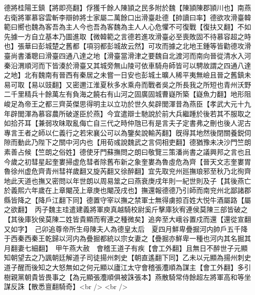 德將桂陽王鎮【將即亮翻】俘獲千餘人陳頴之民多附於魏【陳頴陳郡頴川也】南燕右衛將軍慕容雲斬李辯帥將士家屬二萬餘口出滑臺赴德【帥讀曰率】德欲攻滑臺韓範曰嚮也魏為客吾為主人今也吾為客魏為主人人心危懼不可復戰【復扶又翻】不如先據一方自立基本乃圖進取【微韓範之言德若進攻滑臺必至喪敗固不待慕容超之時也】張華曰彭城楚之舊都【項羽都彭城故云然】可攻而據之北地王鍾等皆勸德攻滑臺尚書潘聰曰滑臺四通八達之地【滑臺當滑津之要魏自北渡河而南向晉從清水入河秦沿渭順河而下皆湊於滑臺又其城旁無山陵可依車騎舟師皆可以騁故謂之四通八達之地】北有魏南有晉西有秦居之未嘗一日安也彭城土曠人稀平夷無嶮且晉之舊鎮未易可取【易以豉翻】又密邇江淮夏秋多水乘舟而戰者吳之所長我之所短也青州沃野二千里精兵十餘萬左有負海之饒右有山河之固廣固城曹嶷所築【嶷魚力翻】地形阻峻足為帝王之都三齊英傑思得明主以立功於世久矣辟閭渾昔為燕臣【孝武大元十九年辟閭渾為慕容農所破遂臣於燕】今宜遣辯士馳說於前大兵繼踵於後若其不服取之如拾芥耳【兼弱攻昧取亂侮亡自三代之時仲虺已有是言夫子定書弗之刪也後人泥古專言王者之師以仁義行之若宋襄公可以為鑒矣說輸芮翻】旣得其地然後閉關養鋭伺隙而動此乃陛下之關中河内也【用荀彧說魏武之言伺相吏翻】德猶豫未决沙門竺朗素善占候【竺朗之俗姓】德使牙門蘇撫問之朗曰敬覽三策潘尚書之議興邦之言也且今歲之初彗星起奎婁掃虚危彗者除舊布新之象奎婁為魯虛危為齊【晉天文志奎婁胃魯徐州虚危齊青州彗祥歲翻又旋芮翻又徐醉翻】宜先取兖州廵撫琅邪至秋乃北徇齊地此天道也撫又密問以年世朗以周易筮之曰燕衰庚戌年則一紀世則及子【其後燕亡於義熙六年歲在上章閹茂上章庚也閹茂戌也】撫還報德德乃引師而南兖州北鄙諸郡縣皆降之【降戶江翻下同】德置守宰以撫之禁軍士無得虜掠百姓大悦牛酒屬路【屬之欲翻】　丙子魏主珪遣建義將軍庾真越騎校尉奚斤擊庫狄宥連侯莫陳三部皆破之【其後庫狄侯莫陳二姓皆貴顯而宥連之種微矣】追奔至大峨谷置戍而還【還從宣翻又如字】　己卯追尊帝所生母陳夫人為德皇太后　夏四月鮮卑疊掘河内帥戶五千降于西秦西秦王乾歸以河内為疊掘都統以宗女妻之【疊掘亦鮮卑一種也河内其名掘其月翻妻七細翻】　甲午燕大赦　會稽王道子有疾【會工外翻】且無日不醉世子元顯知朝望去之乃諷朝廷解道子司徒揚州刺史【朝直遙翻下同】乙未以元顯為揚州刺史道子醒而後知之大怒無如之何元顯以廬江太守會稽張灋順為謀主【會工外翻】多引樹親黨朝貴皆畏事之【為元顯張灋順俱被誅張本】燕散騎常侍餘超左將軍高和等坐謀反誅【散悉亶翻騎奇】<br />
<br />
